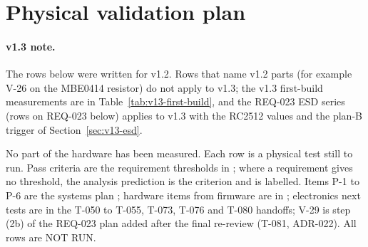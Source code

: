 \section{Physical validation plan}
\label{sec:validation}

\paragraph{v1.3 note.} The rows below were written for v1.2. Rows that name v1.2
parts (for example V-26 on the MBE0414 resistor) do not apply to v1.3; the v1.3
first-build measurements are in Table~\ref{tab:v13-first-build}, and the REQ-023
ESD series (rows on REQ-023 below) applies to v1.3 with the RC2512 values and the
plan-B trigger of Section~\ref{sec:v13-esd}.

No part of the hardware has been measured. Each row is a physical test still to
run. Pass criteria are the requirement thresholds in ;
where a requirement gives no threshold, the analysis prediction is the criterion
and is labelled. Items P-1 to P-6 are the systems plan
; hardware items from firmware are
in ; electronics next tests are in the
T-050 to T-055, T-073, T-076 and T-080 handoffs; V-29 is step (2b) of the REQ-023
plan added after the final re-review (T-081, ADR-022). All rows are NOT RUN.

